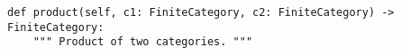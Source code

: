 \begin{verbatim}
def product(self, c1: FiniteCategory, c2: FiniteCategory) -> FiniteCategory:
    """ Product of two categories. """
\end{verbatim}